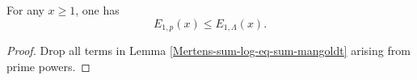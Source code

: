 \begin{corollary}
\label{Mertens-first-error-prime-le-mangoldt}
\leanok
For any $x \geq 1$, one has
$$ E_{1,p}(x) \leq E_{1,\Lambda}(x). $$
\end{corollary}
\begin{proof}
\leanok
Drop all terms in Lemma \ref{Mertens-sum-log-eq-sum-mangoldt} arising from prime powers.
\end{proof}
